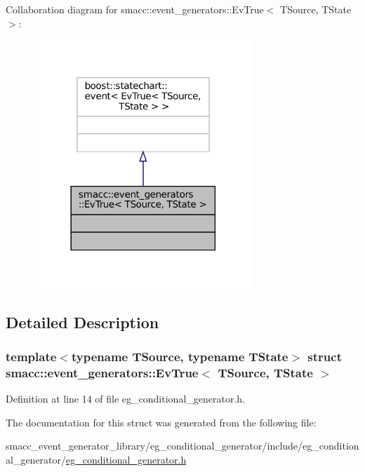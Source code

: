 Collaboration diagram for smacc\+:\+:event\+\_\+generators\+:\+:Ev\+True$<$ T\+Source, T\+State $>$\+:
\nopagebreak
\begin{figure}[H]
\begin{center}
\leavevmode
\includegraphics[width=234pt]{structsmacc_1_1event__generators_1_1EvTrue__coll__graph}
\end{center}
\end{figure}


\subsection{Detailed Description}
\subsubsection*{template$<$typename T\+Source, typename T\+State$>$\newline
struct smacc\+::event\+\_\+generators\+::\+Ev\+True$<$ T\+Source, T\+State $>$}



Definition at line 14 of file eg\+\_\+conditional\+\_\+generator.\+h.



The documentation for this struct was generated from the following file\+:\begin{DoxyCompactItemize}
\item 
smacc\+\_\+event\+\_\+generator\+\_\+library/eg\+\_\+conditional\+\_\+generator/include/eg\+\_\+conditional\+\_\+generator/\hyperlink{eg__conditional__generator_8h}{eg\+\_\+conditional\+\_\+generator.\+h}\end{DoxyCompactItemize}
